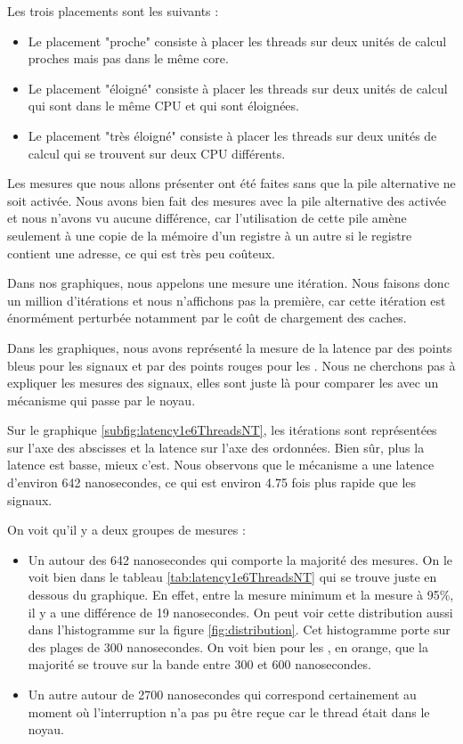 Les trois placements sont les suivants :
\begin{itemize}
  \item Le placement "proche" consiste à placer les threads sur deux unités de calcul proches mais pas dans le même core.
  \item Le placement "éloigné" consiste à placer les threads sur deux unités de calcul qui sont dans le même CPU et qui sont éloignées.
  \item Le placement "très éloigné" consiste à placer les threads sur deux unités de calcul qui se trouvent sur deux CPU différents.
\end{itemize}

Les mesures que nous allons présenter ont été faites sans que la pile alternative ne soit activée.
Nous avons bien fait des mesures avec la pile alternative des \uintr{} activée et nous n'avons vu aucune différence,
car l'utilisation de cette pile amène seulement à une copie de la mémoire d'un registre à un autre si le registre contient une adresse, ce qui est très peu coûteux.

Dans nos graphiques, nous appelons une mesure une itération.
Nous faisons donc un million d'itérations et nous n'affichons pas la première, car cette itération est énormément perturbée notamment par le coût de chargement des caches.

Dans les graphiques, nous avons représenté la mesure de la latence par des points bleus pour les signaux et par des points rouges pour les \uintr{}.
Nous ne cherchons pas à expliquer les mesures des signaux, elles sont juste là pour comparer les \uintr{} avec un mécanisme qui passe par le noyau.

Sur le graphique \ref{subfig:latency1e6ThreadsNT}, les itérations sont représentées sur l'axe des abscisses et la latence sur l'axe des ordonnées.
Bien sûr, plus la latence est basse, mieux c'est.
Nous observons que le mécanisme a une latence d'environ 642 nanosecondes, ce qui est environ 4.75 fois plus rapide que les signaux.

On voit qu'il y a deux groupes de mesures :
\begin{itemize}
  \item Un autour des 642 nanosecondes qui comporte la majorité des mesures.
  On le voit bien dans le tableau \ref{tab:latency1e6ThreadsNT} qui se trouve juste en dessous du graphique.
  En effet, entre la mesure minimum et la mesure à 95\%, il y a une différence de 19 nanosecondes.
  On peut voir cette distribution aussi dans l'histogramme sur la figure \ref{fig:distribution}.
  Cet histogramme porte sur des plages de 300 nanosecondes.
  On voit bien pour les \uintr{}, en orange, que la majorité se trouve sur la bande entre 300 et 600 nanosecondes.
  \item Un autre autour de 2700 nanosecondes qui correspond certainement au moment où l'interruption n'a pas pu être reçue car le thread était dans le noyau.
\end{itemize}


